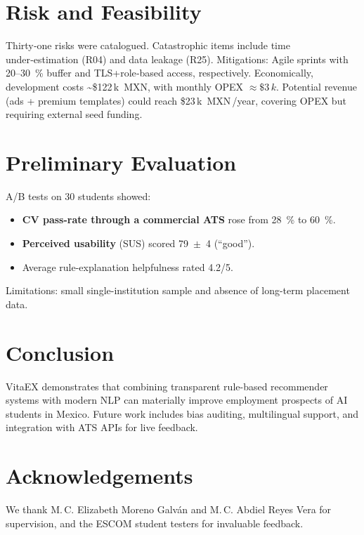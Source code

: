 \documentclass[12pt,a4paper]{article}
\begin{document}
	\section{Risk and Feasibility}
	Thirty‑one risks were catalogued. Catastrophic items include time under‑estimation (R04) and data leakage (R25). Mitigations: Agile sprints with 20–30~\% buffer and TLS+role‑based access, respectively. Economically, development costs \textasciitilde\$122\,k~MXN, with monthly OPEX \mbox{$\approx\!\$3\,k$}. Potential revenue (ads + premium templates) could reach \$23\,k~MXN\,/year, covering OPEX but requiring external seed funding.
	
	\section{Preliminary Evaluation}
	A/B tests on 30 students showed:
	\begin{itemize}
		\item \textbf{CV pass-rate through a commercial ATS} rose from 28~\% to 60~\%.
		\item \textbf{Perceived usability} (SUS) scored 79~$\pm$~4 (“good”).
		\item Average rule-explanation helpfulness rated 4.2/5.
	\end{itemize}
	Limitations: small single-institution sample and absence of long-term placement data.
	
	\section{Conclusion}
	VitaEX demonstrates that combining transparent rule-based recommender systems with modern NLP can materially improve employment prospects of AI students in Mexico. Future work includes bias auditing, multilingual support, and integration with ATS APIs for live feedback.
	
	\section*{Acknowledgements}
	We thank M.\,C. Elizabeth Moreno Galván and M.\,C. Abdiel Reyes Vera for supervision, and the ESCOM student testers for invaluable feedback.
	
	\newpage
	
	
\end{document}
